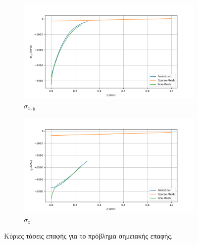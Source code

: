 \documentclass{article}
\begin{document}
\begin{figure}[H]
    \centering
    \begin{subfigure}{0.49\linewidth}
        \centering
        \includegraphics[width=\linewidth]{media/sxp.png}
        \caption{$\sigma_{x,y}$}
    \end{subfigure}
    \hfill
    \begin{subfigure}{0.49\linewidth}
        \centering
        \includegraphics[width=\linewidth]{media/szp.png}
        \caption{$\sigma_{z}$}
    \end{subfigure}
    \caption{Κύριες τάσεις επαφής για το πρόβλημα σημειακής επαφής.}
    \label{fig:b4}
\end{figure}
\end{document}
